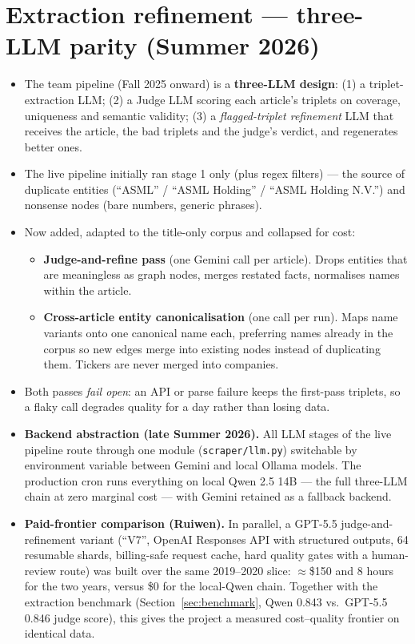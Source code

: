 \documentclass[11pt]{article}
\begin{document}
\section{Extraction refinement --- three-LLM parity (Summer 2026)}
\label{sec:refinement}

\begin{itemize}
  \item The team pipeline (Fall 2025 onward) is a \textbf{three-LLM design}: (1) a triplet-extraction LLM; (2) a Judge LLM scoring each article's triplets on coverage, uniqueness and semantic validity; (3) a \emph{flagged-triplet refinement} LLM that receives the article, the bad triplets and the judge's verdict, and regenerates better ones.
  \item The live pipeline initially ran stage 1 only (plus regex filters) --- the source of duplicate entities (``ASML'' / ``ASML Holding'' / ``ASML Holding N.V.'') and nonsense nodes (bare numbers, generic phrases).
  \item Now added, adapted to the title-only corpus and collapsed for cost:
  \begin{itemize}
    \item \textbf{Judge-and-refine pass} (one Gemini call per article). Drops entities that are meaningless as graph nodes, merges restated facts, normalises names within the article.
    \item \textbf{Cross-article entity canonicalisation} (one call per run). Maps name variants onto one canonical name each, preferring names already in the corpus so new edges merge into existing nodes instead of duplicating them. Tickers are never merged into companies.
  \end{itemize}
  \item Both passes \emph{fail open}: an API or parse failure keeps the first-pass triplets, so a flaky call degrades quality for a day rather than losing data.
  \item \textbf{Backend abstraction (late Summer 2026).} All LLM stages of the live pipeline route through one module (\texttt{scraper/llm.py}) switchable by environment variable between Gemini and local Ollama models. The production cron runs everything on local Qwen 2.5 14B --- the full three-LLM chain at zero marginal cost --- with Gemini retained as a fallback backend.
  \item \textbf{Paid-frontier comparison (Ruiwen).} In parallel, a GPT-5.5 judge-and-refinement variant (``V7'', OpenAI Responses API with structured outputs, 64 resumable shards, billing-safe request cache, hard quality gates with a human-review route) was built over the same 2019--2020 slice: \(\approx\)\$150 and 8 hours for the two years, versus \$0 for the local-Qwen chain. Together with the extraction benchmark (Section~\ref{sec:benchmark}, Qwen 0.843 vs.\ GPT-5.5 0.846 judge score), this gives the project a measured cost--quality frontier on identical data.
\end{itemize}
\end{document}

